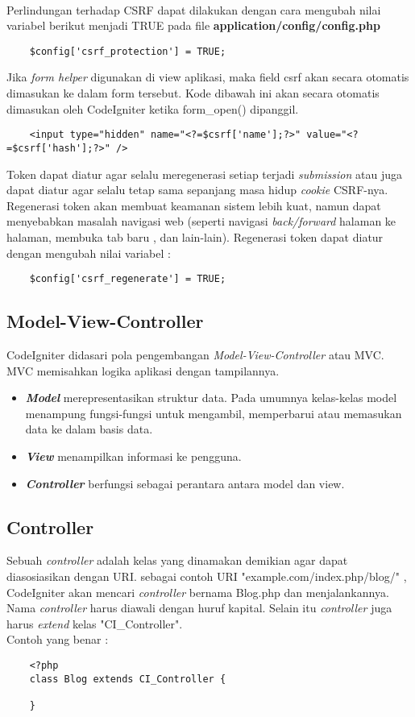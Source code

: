 \paragraph{} Perlindungan terhadap CSRF dapat dilakukan dengan cara mengubah nilai variabel berikut menjadi TRUE pada file \textbf{application/config/config.php} \cite{CodeIgniter:17}
\begin{lstlisting}
	$config['csrf_protection'] = TRUE;
\end{lstlisting}
Jika \textit{form helper} digunakan di view aplikasi, maka field csrf akan secara otomatis dimasukan ke dalam form tersebut. Kode dibawah ini akan secara otomatis dimasukan oleh CodeIgniter ketika form\_open() dipanggil.
\begin{lstlisting}
	<input type="hidden" name="<?=$csrf['name'];?>" value="<?=$csrf['hash'];?>" />
\end{lstlisting}
Token dapat diatur agar selalu meregenerasi setiap terjadi \textit{submission} atau juga dapat diatur agar selalu tetap sama sepanjang masa hidup \textit{cookie} CSRF-nya. Regenerasi token akan membuat keamanan sistem lebih kuat, namun dapat menyebabkan masalah navigasi web (seperti navigasi \textit{back/forward} halaman ke halaman, membuka tab baru , dan lain-lain). Regenerasi token dapat diatur dengan mengubah nilai variabel : \cite{CodeIgniter:17}
\begin{lstlisting}
	$config['csrf_regenerate'] = TRUE;
\end{lstlisting}
\subsection{Model-View-Controller}
CodeIgniter didasari pola pengembangan \textit{Model-View-Controller} atau MVC. MVC memisahkan logika aplikasi dengan tampilannya. \cite{CodeIgniter:17}
\begin{itemize}
		\item \textbf{\textit{Model}} merepresentasikan struktur data. Pada umumnya kelas-kelas model menampung fungsi-fungsi untuk mengambil, memperbarui atau memasukan data ke dalam basis data.
		\item \textbf{\textit{View}} menampilkan informasi ke pengguna. 
		\item \textbf{\textit{Controller}} berfungsi sebagai perantara antara model dan view.
\end{itemize}

\subsection{Controller}
Sebuah \textit{controller} adalah kelas yang dinamakan demikian agar dapat diasosiasikan dengan URI.
sebagai contoh URI "example.com/index.php/blog/" , CodeIgniter akan mencari \textit{controller} bernama Blog.php dan menjalankannya. Nama \textit{controller} harus diawali dengan huruf kapital. Selain itu \textit{controller} juga harus  \textit{extend} kelas "CI\_Controller". \cite{CodeIgniter:17} \\ 
Contoh yang benar :
\begin{lstlisting}
	<?php
	class Blog extends CI_Controller {

	}
\end{lstlisting}


